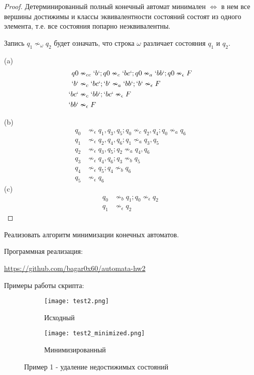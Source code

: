 \begin{proof}
    Детерминированный полный конечный автомат минимален $\Leftrightarrow$ 
    в нем все вершины достижимы и классы эквивалентности состояний 
    состоят из одного элемента, т.е. все состояния попарно неэквивалентны.

    Запись $q_1 \nsim_{\omega} q_2$ будет означать, 
    что строка $\omega$ различает состояния $q_1$ и $q_2$.  

    (a)
    \begin{align*}
        q0 &\nsim_{cc} \lq{b}\lq; q0 \nsim_{c} \lq bc \lq; q0 \nsim_{a} \lq bb \lq; q0 \nsim_{\epsilon} F \\
        \lq b \lq &\nsim_{c} \lq bc \lq; \lq b \lq \nsim_{a} \lq bb \lq; \lq b \lq \nsim_{\epsilon} F \\
        \lq bc \lq &\nsim_{c} \lq bb \lq; \lq bc \lq \nsim_{\epsilon} F \\
        \lq bb \lq &\nsim_{\epsilon} F
    \end{align*}

    (b)
    \begin{align*}
        q_0 &\nsim_{\epsilon} q_1, q_3, q_5; q_0 \nsim_{c} q_2, q_4; q_0 \nsim_{a} q_6   \\
        q_1 &\nsim_{\epsilon} q_2, q_4, q_6; q_1 \nsim_{a} q_3, q_5 \\
        q_2 &\nsim_{\epsilon} q_3, q_5; q_2 \nsim_{a} q_4, q_6 \\
        q_3 &\nsim_{\epsilon} q_4, q_6; q_3 \nsim_{b} q_5 \\
        q_4 &\nsim_{\epsilon} q_5; q_4 \nsim_{b} q_6 \\
        q_5 &\nsim_{\epsilon} q_6
    \end{align*}
    (c)
    \begin{align*}
        q_0 &\nsim_{b} q_1; q_0 \nsim_{\epsilon} q_2 \\
        q_1 &\nsim_{\epsilon} q_2
    \end{align*}
\end{proof}

\begin{problem}
    Реализовать алгоритм минимизации конечных автоматов.
\end{problem}

Программная реализация:

\url{https://github.com/bagar0x60/automata-hw2}
\break

Примеры работы скрипта:

\begin{figure}[h]
    \centering
    \begin{subfigure}[b]{0.4\linewidth}
      \texttt{[image: test2.png]}
      \caption{Исходный}
    \end{subfigure}
    \begin{subfigure}[b]{0.4\linewidth}
      \texttt{[image: test2\_minimized.png]}
      \caption{Минимизированный}
    \end{subfigure}
    \caption{Пример 1 - удаление недостижимых состояний}
\end{figure}

